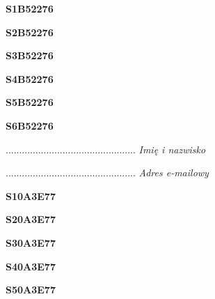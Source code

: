 \begin{turn}{90}\huge \textbf{S1B52276}\end{turn}

\begin{turn}{90}\huge \textbf{S2B52276}\end{turn}

\begin{turn}{90}\huge \textbf{S3B52276}\end{turn}

\begin{turn}{90}\huge \textbf{S4B52276}\end{turn}

\begin{turn}{90}\huge \textbf{S5B52276}\end{turn}

\begin{turn}{90}\huge \textbf{S6B52276}\end{turn}

\begin{turn}{90}\begin{minipage}{\linewidth} \vspace{20mm} ................................................  \textit{Imię i nazwisko}\end{minipage}\end{turn}

\begin{turn}{90}\begin{minipage}{\linewidth} \vspace{20mm} ................................................  \textit{Adres e-mailowy}\end{minipage}\end{turn}

\begin{turn}{90}\huge \textbf{S10A3E77}\end{turn}

\begin{turn}{90}\huge \textbf{S20A3E77}\end{turn}

\begin{turn}{90}\huge \textbf{S30A3E77}\end{turn}

\begin{turn}{90}\huge \textbf{S40A3E77}\end{turn}

\begin{turn}{90}\huge \textbf{S50A3E77}\end{turn}

